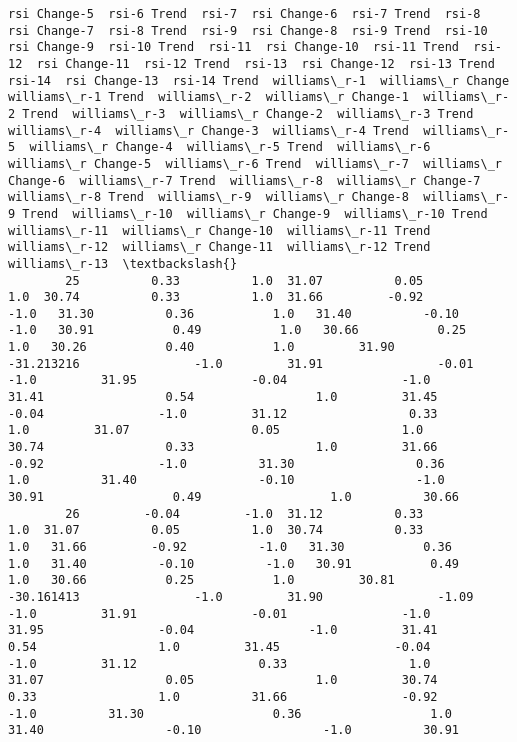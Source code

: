 \documentclass[11pt]{article}
\begin{document}
\begin{Verbatim}[commandchars=\\\{\}]
            rsi Change-5  rsi-6 Trend  rsi-7  rsi Change-6  rsi-7 Trend  rsi-8  rsi Change-7  rsi-8 Trend  rsi-9  rsi Change-8  rsi-9 Trend  rsi-10  rsi Change-9  rsi-10 Trend  rsi-11  rsi Change-10  rsi-11 Trend  rsi-12  rsi Change-11  rsi-12 Trend  rsi-13  rsi Change-12  rsi-13 Trend  rsi-14  rsi Change-13  rsi-14 Trend  williams\_r-1  williams\_r Change  williams\_r-1 Trend  williams\_r-2  williams\_r Change-1  williams\_r-2 Trend  williams\_r-3  williams\_r Change-2  williams\_r-3 Trend  williams\_r-4  williams\_r Change-3  williams\_r-4 Trend  williams\_r-5  williams\_r Change-4  williams\_r-5 Trend  williams\_r-6  williams\_r Change-5  williams\_r-6 Trend  williams\_r-7  williams\_r Change-6  williams\_r-7 Trend  williams\_r-8  williams\_r Change-7  williams\_r-8 Trend  williams\_r-9  williams\_r Change-8  williams\_r-9 Trend  williams\_r-10  williams\_r Change-9  williams\_r-10 Trend  williams\_r-11  williams\_r Change-10  williams\_r-11 Trend  williams\_r-12  williams\_r Change-11  williams\_r-12 Trend  williams\_r-13  \textbackslash{}
        25          0.33          1.0  31.07          0.05          1.0  30.74          0.33          1.0  31.66         -0.92         -1.0   31.30          0.36           1.0   31.40          -0.10          -1.0   30.91           0.49           1.0   30.66           0.25           1.0   30.26           0.40           1.0         31.90         -31.213216                -1.0         31.91                -0.01                -1.0         31.95                -0.04                -1.0         31.41                 0.54                 1.0         31.45                -0.04                -1.0         31.12                 0.33                 1.0         31.07                 0.05                 1.0         30.74                 0.33                 1.0         31.66                -0.92                -1.0          31.30                 0.36                  1.0          31.40                 -0.10                 -1.0          30.91                  0.49                  1.0          30.66   
        26         -0.04         -1.0  31.12          0.33          1.0  31.07          0.05          1.0  30.74          0.33          1.0   31.66         -0.92          -1.0   31.30           0.36           1.0   31.40          -0.10          -1.0   30.91           0.49           1.0   30.66           0.25           1.0         30.81         -30.161413                -1.0         31.90                -1.09                -1.0         31.91                -0.01                -1.0         31.95                -0.04                -1.0         31.41                 0.54                 1.0         31.45                -0.04                -1.0         31.12                 0.33                 1.0         31.07                 0.05                 1.0         30.74                 0.33                 1.0          31.66                -0.92                 -1.0          31.30                  0.36                  1.0          31.40                 -0.10                 -1.0          30.91   

\end{Verbatim}
\end{document}
